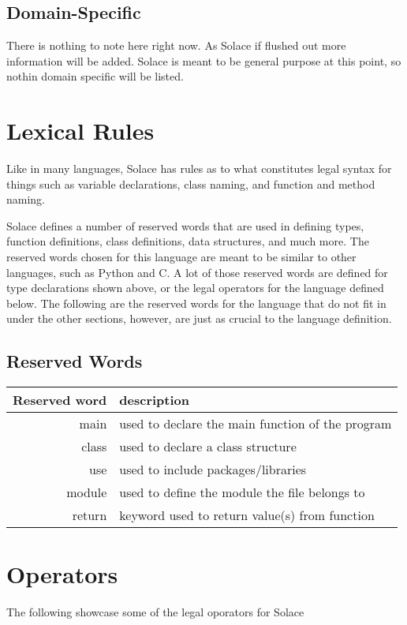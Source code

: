 \documentclass{article}
\begin{document}
\subsection{Domain-Specific}
There is nothing to note here right now. As Solace if flushed out more information will be added.
Solace is meant to be general purpose at this point, so nothin domain specific will be listed.


\section{Lexical Rules}
Like in many languages, Solace has rules as to what constitutes legal syntax for things such as
variable declarations, class naming, and function and method naming.

Solace defines a number of reserved words that are used in defining types, function definitions,
class definitions, data structures, and much more. The reserved words chosen for this language
are meant to be similar to other languages, such as Python and C. A lot of those reserved words
are defined for type declarations shown above, or the legal operators for the language defined
below. The following are the reserved words for the language that do not fit in under the other
sections, however, are just as crucial to the language definition.

\subsection{Reserved Words}

\begin{tabular}{r|l}
Reserved word & description \\
\hline
\hline
main & used to declare the main function of the program \\
class & used to declare a class structure \\
use & used to include packages/libraries \\
module & used to define the module the file belongs to \\
return & keyword used to return value(s) from function \\
\hline
\end{tabular}


\section{Operators}
The following showcase some of the legal oporators for Solace
\end{document}
